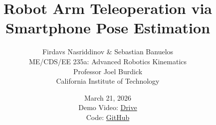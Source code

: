 \documentclass[12pt, titlepage, floatsintext]{article} %
\begin{document}
\title{Robot Arm Teleoperation via Smartphone Pose Estimation}
\author{
    Firdavs Nasriddinov \& Sebastian Banuelos\\
    ME/CDS/EE 235a: Advanced Robotics Kinematics \\
    Professor Joel Burdick \\
    California Institute of Technology
}
\date{
    March 21, 2026 \\[1em]
    Demo Video: \href{https://drive.google.com/file/d/1iJ-YPce5TwE5rri7qKfI2MuopTnw3I6X/view?usp=sharing}{Drive} \\
    Code: \href{https://github.com/firdavsn/robot-arm-teleop}{GitHub} \\
}
\maketitle









\end{document}
